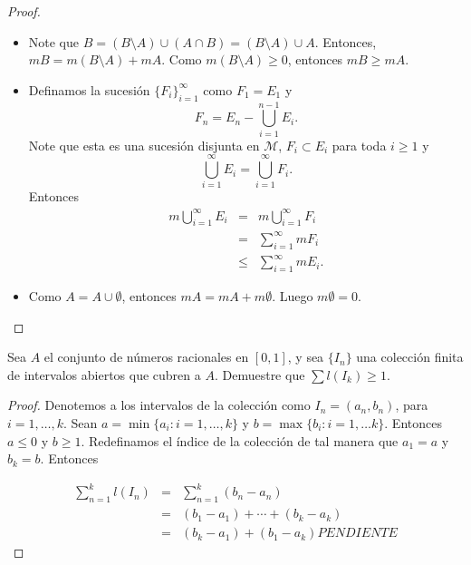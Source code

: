 \documentclass[12pt]{article}
\newenvironment{problem}[2][Problema]{\begin{trivlist}
\item[\hskip \labelsep {\bfseries #1}\hskip \labelsep {\bfseries #2.}]}{\end{trivlist}}
\begin{document}
\begin{proof}
\begin{itemize}
    \item[a)] Note que $B = (B \setminus A) \cup (A \cap B) = (B \setminus A) \cup A$. Entonces, $m B = m  (B \setminus A) + m A$. Como $m  (B \setminus A) \geq 0$, entonces $m B \geq m A.$
    \item[b)] Definamos la sucesión $\{ F_i \}_{i=1}^\infty$ como $F_1 = E_1$ y 
    $$F_n = E_n - \bigcup_{i=1}^{n-1} E_i.$$
Note que esta es una sucesión disjunta en $\mathcal M$, $F_i \subset E_i$ para toda $i \geq 1$ y 
$$\bigcup_{i=1}^{\infty} E_i  = \bigcup_{i=1}^{\infty} F_i.$$
Entonces 
\begin{eqnarray*}
    m \bigcup_{i=1}^{\infty} E_i  &=& m \bigcup_{i=1}^{\infty} F_i \\
    &=& \sum_{i=1}^{\infty} m F_i \\
    &\leq& \sum_{i=1}^{\infty} m E_i.
\end{eqnarray*}

\item[c)] Como $A = A \cup \emptyset$, entonces 
$m A = m A + m \emptyset$. Luego $m \emptyset = 0.$
\end{itemize}
\end{proof}


\begin{problem}{4} Sea $A$ el conjunto de números racionales en $[0, 1]$, y sea $\{I_n\}$ una colección finita de intervalos abiertos que cubren a $A$. Demuestre que $\sum l(I_k) \geq 1. $  
\end{problem}
\begin{proof}
Denotemos a los intervalos de la colección como $I_n = (a_n, b_n)$, para $i=1, \ldots, k$. Sean $a = \min \{ a_i: i=1, \ldots, k \}$ y $b = \max \{b_i: i=1, \ldots k \}$. Entonces $a \leq 0$ y $b \geq 1.$ Redefinamos el  índice de la colección de tal manera que $a_1 = a$ y $b_k = b$. Entonces 

\begin{eqnarray*}
     \sum_{n=1}^k l(I_n) &=&  \sum_{n=1}^k (b_n - a_n)\\
     &=& (b_1 - a_1) + \cdots + (b_k - a_k) \\
     &=& (b_k - a_1) + (b_1 - a_k) PENDIENTE
\end{eqnarray*}



\end{proof}
\end{document}
